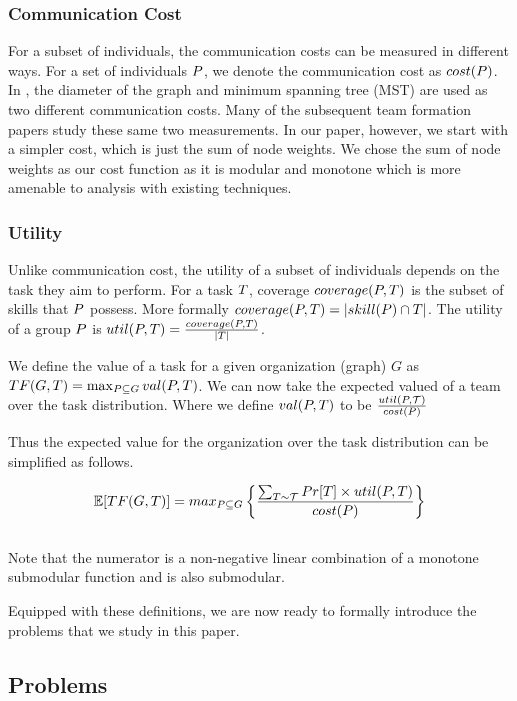 \subsubsection{Communication Cost}
For a subset of individuals, the communication costs can be measured in different ways. 
For a set of individuals $P$, we denote the communication cost as $cost(P)$. 
In \cite{lappas2009finding}, the diameter of the graph and minimum spanning tree (MST) are used as two different communication costs.
Many of the subsequent team formation papers study these same two measurements.
In our paper, however, we start with a simpler cost, which is just the sum of node weights. We chose the sum of node weights as our cost function as it is modular and monotone which is more amenable to analysis with existing techniques. 

\subsubsection{Utility}
Unlike communication cost, the utility of a subset of individuals depends on the task they aim to perform. 
For a task $T$, coverage $coverage(P,T)$ is the subset of skills that $P$ possess.
More formally $coverage(P,T) = |skill(P) \cap T|$.
The utility of a group $ P $ is ${util}(P,T) = \frac{coverage(P, T)}{|T|}$.

We define the value of a task for a given organization (graph) $G$ as $TF(G,T) = \max_{P \subseteq G}{val(P,T)}$. We can now take the expected valued of a team over the task distribution. Where we define $val(P,T)$ to be $\frac{{util}(P,\mathcal{T})}{cost(P)} $

Thus the expected value for the organization over the task distribution can be simplified as follows.

$$\mathbb{E}[TF(G,T)] = max_{P \subseteq G} \left\{ \frac{\sum_{T \sim \mathcal{T} } Pr[T] \times {util}(P, T)} {cost(P)} \right\} $$ \\

Note that the numerator is a non-negative linear combination of a monotone submodular function and is also submodular.

Equipped with these definitions, we are now ready to formally introduce the problems that we study in this paper.

\subsection{Problems}

